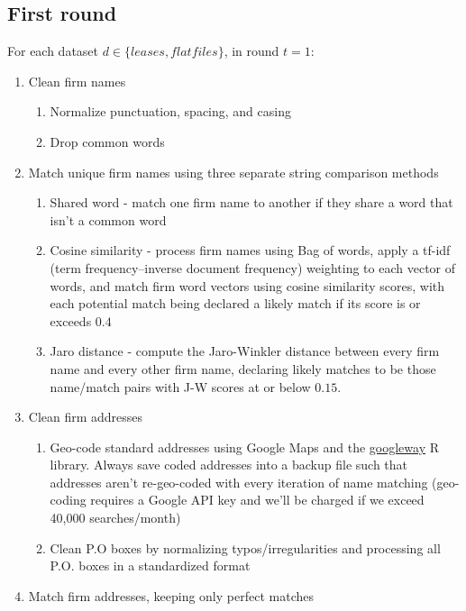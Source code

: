 \documentclass{article}
\begin{document}
\subsection{First round}
For each dataset $d \in \{leases, flatfiles\}$, in round $t =  1$:
\begin{enumerate}
    \item Clean firm names 
    \begin{enumerate}
    \item Normalize punctuation, spacing, and casing
    \item Drop common words
    \end{enumerate}
    
    \item Match unique firm names using three separate string comparison methods
     \begin{enumerate}
    \item Shared word - match one firm name to another if they share a word that isn't a common word
    \item Cosine similarity - process firm names using Bag of words, apply a tf-idf (term frequency–inverse document frequency) weighting to each vector of words, and match firm word vectors using cosine similarity scores, with each potential match being declared a likely match if its score is or exceeds $0.4$ 
     \item Jaro distance - compute the Jaro-Winkler distance between every firm name and every other firm name, declaring likely matches to be those name/match pairs with J-W scores at or below $0.15$. 
    \end{enumerate}
    
    \item Clean firm addresses 
    \begin{enumerate}
    \item Geo-code standard addresses using Google Maps and the \href{https://cran.r-project.org/web/packages/googleway/googleway.pdf}{googleway} R library. Always save coded addresses into a backup file such that addresses aren't re-geo-coded with every iteration of name matching (geo-coding requires a Google API key and we'll be charged if we exceed 40,000 searches/month) 
    \item Clean P.O boxes by normalizing typos/irregularities and processing all P.O. boxes in a standardized format
    \end{enumerate}
    
    \item Match firm addresses, keeping only perfect matches


\end{enumerate}
\end{document}
